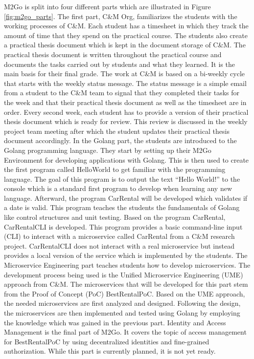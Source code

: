 M2Go is split into four different parts which are illustrated in Figure
\ref{fig:m2go_parts}. The first part, C\&M Org, familiarizes the students with
the working processes of C\&M. Each student has a timesheet in which they track
the amount of time that they spend on the practical course. The students also
create a practical thesis document which is kept in the document storage of
C\&M. The practical thesis document is written throughout the practical course
and documents the tasks carried out by students and what they learned. It is
the main basis for their final grade. The work at C\&M is based on a bi-weekly
cycle that starts with the weekly status message. The status message is a
simple email from a student to the C\&M team to signal that they completed
their tasks for the week and that their practical thesis document as well as
the timesheet are in order. Every second week, each student has to provide a
version of their practical thesis document which is ready for review. This
review is discussed in the weekly project team meeting after which the student
updates their practical thesis document accordingly. In the Golang part, the
students are introduced to the Golang programming language. They start by
setting up their M2Go Environment for developing applications with Golang. This
is then used to create the first program called HelloWorld to get familiar with
the programming language. The goal of this program is to output the text
``Hello World!'' to the console which is a standard first program to develop
when learning any new language. Afterward, the program CarRental will be
developed which validates if a date is valid. This program teaches the students
the fundamentals of Golang like control structures and unit testing. Based on
the program CarRental, CarRentalCLI is developed. This program provides a basic
command-line input (CLI) to interact with a microservice called CarRental from
a C\&M research project. CarRentalCLI does not interact with a real
microservice but instead provides a local version of the service which is
implemented by the students. The Microservice Engineering part teaches students
how to develop microservices. The development process being used is the Unified
Microservice Engineering (UME) approach from C\&M. The microservices that will
be developed for this part stem from the Proof of Concept (PoC) BestRentalPoC.
Based on the UME approach, the needed microservices are first analyzed and
designed. Following the design, the microservices are then implemented and
tested using Golang by employing the knowledge which was gained in the previous
part. Identity and Access Management is the final part of M2Go. It covers the
topic of access management for BestRentalPoC by using decentralized identities
and fine-grained authorization. While this part is currently planned, it is not
yet ready.

